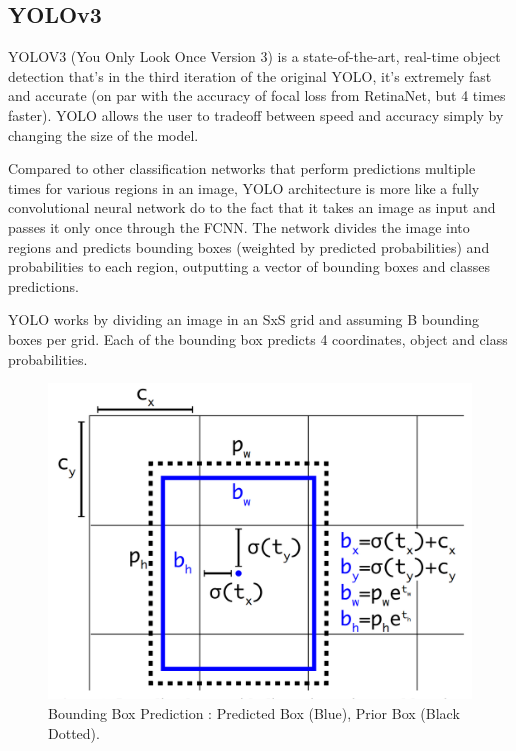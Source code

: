
    \subsection{YOLOv3}

    YOLOV3 (You Only Look Once Version 3) is a state-of-the-art, real-time object detection that’s in the third iteration of the original YOLO, it’s extremely fast and accurate (on par with the accuracy of focal loss from RetinaNet, but 4 times faster). YOLO allows the user to tradeoff between speed and accuracy simply by changing the size of the model.\par

    Compared to other classification networks that perform predictions multiple times for various regions in an image, YOLO architecture is more like a fully convolutional neural network do to the fact that it takes an image as input and passes it only once through the FCNN. The network divides the image into regions and predicts bounding boxes (weighted by predicted probabilities) and probabilities to each region, outputting a vector of bounding boxes and classes predictions. \par 
    
    \par YOLO works by dividing an image in an SxS grid and assuming B bounding boxes per grid. Each of the bounding box predicts 4 coordinates, object and class probabilities. \cite{Agarwal2019}

    \begin{figure}[htb]
        \centering
        \includegraphics[scale = 0.13]{Sections/2StateOfTheArt/2_images/yolo_boundingbox.png}
        \caption{Bounding Box Prediction : Predicted Box (Blue), Prior Box (Black Dotted).\cite{Redmon2018}} 
    \end{figure}

